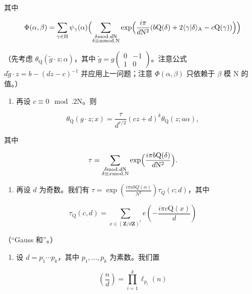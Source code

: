 其中

\[
\Phi (\alpha ,\beta) = \sum_{\gamma \in \mathrm{H}}\psi_{\gamma}(\alpha)\Bigl (\sum_{\substack{\delta \text{mod.} d\mathrm{N}\\ \delta \equiv \alpha \text{mod.}\mathrm{N}}}\exp \Bigl (\frac{i\pi}{d\mathrm{N}^{2}} (b\mathrm{Q}(\delta) + 2\langle \gamma |\delta \rangle_{\mathrm{A}} - c\mathrm{Q}(\gamma))\Bigr)\Bigr)
\]

（先考虑 \(\theta_{\mathrm{Q}}(\widetilde{g} \cdot z; \alpha)\)，其中 \(\widetilde{g} = g\begin{pmatrix} 0 & -1 \\ 1 & 0 \end{pmatrix}\)。注意公式 \(d\widetilde{g} \cdot z = b - (dz - c)^{-1}\) 并应用上一问题；注意 \(\Phi(\alpha, \beta)\) 只依赖于 \(\beta\) 模 N 的值。）

\begin{enumerate}
\def\labelenumi{\alph{enumi})}
\setcounter{enumi}{7}
\tightlist
\item
  再设 \(c \equiv 0 \mod. 2\mathrm{N}\)。则
\end{enumerate}

\[
\theta_ {\mathrm{Q}} (g \cdot z; x) = \frac {\tau}{d ^ {r / 2}} (c z + d) ^ {k} \theta_ {\mathrm{Q}} (z; a \alpha),
\]

其中

\[
\tau = \sum_{\substack{\delta \text{mod.} d\mathrm{N}\\ \delta \equiv x\text{mod.}\mathrm{N}}}\exp \Bigl (\frac{i\pi b\mathrm{Q}(\delta)}{d\mathrm{N}^{2}}\Bigr).
\]

\begin{enumerate}
\def\labelenumi{\roman{enumi})}
\tightlist
\item
  再设 \(d\) 为奇数。我们有 \(\tau = \exp \left(\frac{i\pi abQ(\alpha)}{N^2}\right)\tau_Q(c;d)\)，其中
\end{enumerate}

\[
\tau_ {\mathrm{Q}} (c, d) = \sum_ {x \in (\mathbf {Z} / d \mathbf {Z}) ^ {r}} e \left(- \frac {i \pi c \mathrm{Q} (x)}{d}\right)
\]

（“Gauss 和”。）

\begin{enumerate}
\def\labelenumi{\alph{enumi})}
\setcounter{enumi}{9}
\tightlist
\item
  设 \(d = p_{1} \cdots p_{k}\)，其中 \(p_{1}, \ldots, p_{k}\) 为素数。我们置
\end{enumerate}

\[
\left(\frac {n}{d}\right) = \prod_ {i = 1} ^ {k} \ell_ {p _ {i}} (n)
\]

